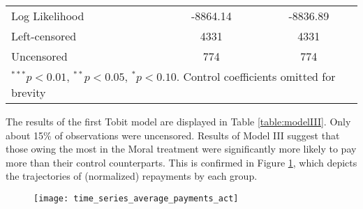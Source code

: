 \documentclass[12pt,titlepage]{article}
\begin{document}
\begin{table}[htbp]
\begin{center}
\begin{tabular}{l c c }
Log Likelihood         & -8864.14          & -8836.89          \\
Left-censored          & 4331              & 4331              \\
Uncensored             & 774               & 774               \\
\hline
\multicolumn{3}{l}{\scriptsize{$^{***}p<0.01$, $^{**}p<0.05$, $^*p<0.10$. Control coefficients omitted for brevity}}
\end{tabular}
\end{center}
\end{table}

The results of the first Tobit model are displayed in Table
\ref{table:modelIII}.  Only about 15\% of observations were
uncensored. Results of Model III suggest that those owing the most in
the Moral treatment were significantly more likely to pay more than
their control counterparts. This is confirmed in Figure
\ref{repay_quart_act}, which depicts the trajectories of (normalized)
repayments by each group.

\begin{figure}[htbp]
\begin{center}
\caption{}\label{repay_quart_act}
\texttt{[image: time\_series\_average\_payments\_act]}
\par\end{center}
\end{figure}
\end{document}
